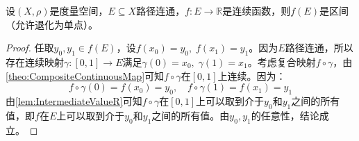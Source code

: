 \begin{theorem}\label{theo:IntermediateValue}
	设$(X,\rho)$是度量空间，$E\subseteq X$路径连通，$f:E\to\mathbb{R}$是连续函数，则$f(E)$是区间（允许退化为单点）。
\end{theorem}
\begin{proof}
	任取$y_0,y_1\in f(E)$，设$f(x_0)=y_0,\;f(x_1)=y_1$。因为$E$路径连通，所以存在连续映射$\gamma:[0,1]\to E$满足$\gamma(0)=x_0,\;\gamma(1)=x_1$。考虑复合映射$f\circ\gamma$，由\cref{theo:CompositeContinuousMap}可知$f\circ\gamma$在$[0,1]$上连续。因为：
	\begin{equation*}
		f\circ\gamma(0)=f(x_0)=y_0,\quad f\circ\gamma(1)=f(x_1)=y_1
	\end{equation*}
	由\cref{lem:IntermediateValueR}可知$f\circ\gamma$在$[0,1]$上可以取到介于$y_0$和$y_1$之间的所有值，即$f$在$E$上可以取到介于$y_0$和$y_1$之间的所有值。由$y_0,y_1$的任意性，结论成立。
\end{proof}

